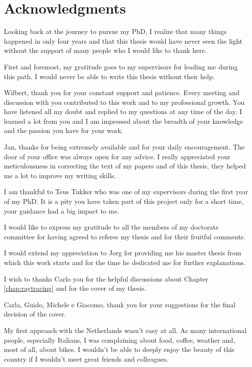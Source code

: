 
\chapter*{Acknowledgments}
\markboth{}{}
Looking back at the journey to pursue my PhD, I realize that many things happened in only four years and that this thesis would have never seen the light without the support of many people who I would like to thank here.  

First and foremost, my gratitude goes to my supervisors for leading me during this path. I would never be able to write this thesis without their help.

Wilbert, thank you for your constant support and patience. Every meeting and discussion with you contributed to this work and to my professional growth. 
You have listened all my doubt and replied to my questions at any time of the day.
I learned a lot from you and I am impressed about the breadth of your knowledge and the passion you have for your work. 

Jan, thanks for being extremely available and for your daily encouragement. The door of your office was always open for any advice. 
I really appreciated your meticulousness in correcting the text of my papers and of this thesis, they helped me a lot to improve my writing skills.

I am thankful to Teus Tukker who was one of my supervisors during the first year of my PhD. It is a pity you have taken part of this project only for a short time, your guidance had a big impact to me.

I would like to express my gratitude to all the members of my doctorate committee for having agreed to referee my thesis and for their fruitful comments.  

I would extend my appreciation to Jorg for providing me his master thesis from which this work starts and for the time he dedicated me for further explanations.

I wish to thanks Carlo you for the helpful discussions about Chapter \ref{chap:raytracing} and for the cover of my thesis. 

Carla, Guido, Michele e Giacomo, thank you for your suggestions for the final decision of the cover.

My first approach with the Netherlands wasn't easy at all. As many international people, especially Italians, I was complaining about food, coffee, weather and, most of all, about bikes. 
I wouldn't be able to deeply enjoy the beauty of this country if I wouldn't meet great friends and colleagues.

